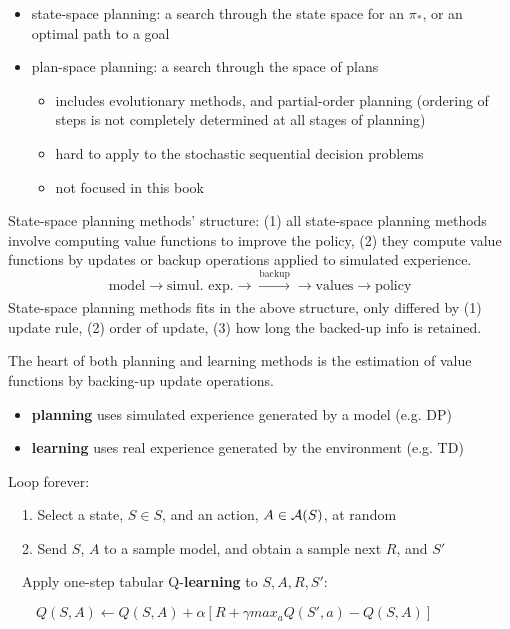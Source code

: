 \documentclass[sutton_barto_notes.tex]{subfiles}
\begin{document}
\begin{itemize}
\item state-space planning: a search through the state space for an $\pi_*$, or an optimal path to a goal
\item plan-space planning: a search through the space of plans
\begin{itemize}
	\item includes evolutionary methods, and partial-order planning (ordering of steps is not completely determined at all stages of planning)
	\item hard to apply to the stochastic sequential decision problems
	\item not focused in this book
\end{itemize}
\end{itemize}

State-space planning methods' structure: (1) all state-space planning methods involve computing value functions to improve the policy, (2) they compute value functions by updates or backup operations applied to simulated experience.
$$ \text{model} \rightarrow \text{simul. exp.} \rightarrow \xrightarrow[]{\text{backup}} \rightarrow \text{values} \rightarrow \text{policy} $$
State-space planning methods fits in the above structure, only differed by (1) update rule, (2) order of update, (3) how long the backed-up info is retained.

The heart of both planning and learning methods is the estimation of value functions by backing-up update operations.
\begin{itemize}
\item \textbf{planning} uses simulated experience generated by a model (e.g. DP)
\item \textbf{learning} uses real experience generated by the environment (e.g. TD)
\end{itemize}


\begin{tcolorbox}[width=1.1\textwidth,title={Random-sample one-step tabular Q-\textbf{planning}}]
Loop forever:

$\quad$1. Select a state, $S \in S$, and an action, $A \in \operatorname*{\mathcal{A}}(S)$, at random

$\quad$2. Send $S$, $A$ to a sample model, and obtain a sample next $R$, and $S'$

$\quad$Apply one-step tabular Q-\textbf{learning} to $S,A,R,S'$:

$\quad\quad Q(S,A)\leftarrow Q(S,A) + \alpha [R + \gamma max_a Q(S',a) - Q(S,A)]$
\end{tcolorbox}
\end{document}
